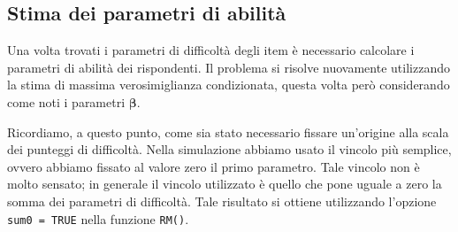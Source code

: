 
\subsection{Stima dei parametri di abilità}

Una volta trovati i parametri di difficoltà degli item è necessario calcolare i parametri di abilità dei rispondenti. Il problema si risolve nuovamente utilizzando la stima di massima verosimiglianza condizionata, questa volta però considerando come noti i parametri $\boldsymbol{\beta}$.  

Ricordiamo, a questo punto, come sia stato necessario fissare un'origine alla scala dei punteggi di difficoltà. Nella simulazione abbiamo usato il vincolo più semplice, ovvero abbiamo fissato al valore zero il primo parametro.  Tale vincolo non è molto sensato; in generale il vincolo utilizzato è quello che pone uguale a zero la somma dei parametri di difficoltà. Tale risultato si ottiene utilizzando l'opzione {\tt sum0 = TRUE} nella funzione {\tt RM()}.

